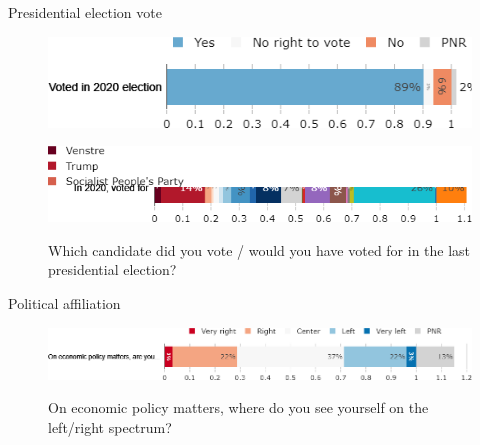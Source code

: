 \documentclass[aspectratio=169,9pt,dvipsnames]{beamer}
\begin{document}
\begin{frame}{Presidential election vote}%
\vspace{-.5cm}
\begin{figure}[h!]
\caption{Did you vote in the 2020 Danish presidential election?}
\includegraphics[width=.6\textwidth]{../figures/DK/vote_participation_DK.png} \\
\vspace{.1cm}
\caption{Which candidate did you vote / would you have voted for in the last presidential election?}
\includegraphics[width=.8\textwidth]{../figures/DK/vote_DK.png} \\
\end{figure}
\end{frame}

\begin{frame}{Political affiliation}%
\vspace{-.5cm}
\begin{figure}[h!]
\caption{On economic policy matters, where do you see yourself on the left/right spectrum?}
\includegraphics[width=.8\textwidth]{../figures/DK/left_right_DK.png} \\
\end{figure}
\end{frame}
\end{document}

